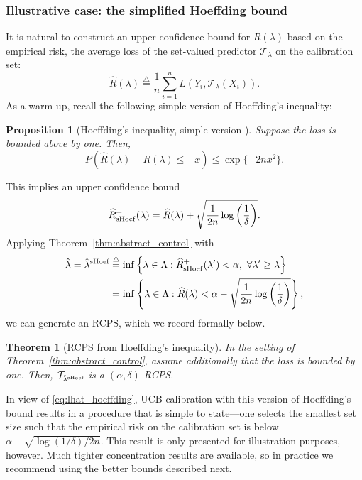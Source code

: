 \documentclass[10pt]{article}
\newtheorem{theorem}{Theorem}
\newtheorem{prop}{Proposition}
\newcommand{\T}{\mathcal{T}}
\newcommand{\lhat}{\hat{\lambda}}
\newcommand{\Rhat}{\widehat{R}}
\newcommand{\triangleq}{\stackrel{\triangle}{=}}
\begin{document}
\subsubsection{Illustrative case: the simplified Hoeffding bound}
\label{sec:hoeffding}
It is natural to construct an upper confidence bound for $R(\lambda)$ based on the empirical risk, the average loss of the set-valued predictor $\T_\lambda$ on the calibration set: 
\begin{equation*}
\widehat{R}(\lambda) \triangleq \frac{1}{n} \sum_{i=1}^n L\left(Y_i, \T_\lambda(X_i)\right).
\end{equation*}
As a warm-up, recall the following simple version of Hoeffding's inequality:
\begin{prop}[Hoeffding's inequality, simple version  \cite{hoeffding1963}]
Suppose the loss is bounded above by one. Then,
\begin{equation*}
P\left( \widehat{R}(\lambda) - R(\lambda) \le -x\right) \le \exp\{-2nx^2\}.
\label{eq:hoeffding_bound}
\end{equation*}
\end{prop}
This implies an upper confidence bound 
\begin{equation}\label{eq:Rhat_sim_hoeffding}
\widehat{R}^+_{{\rm sHoef}}(\lambda) = \widehat{R}(\lambda) + \sqrt{\frac{1}{2n}\log\left(\frac{1}{\delta}\right)}.
\end{equation}
Applying Theorem~\ref{thm:abstract_control} with 
\begin{align}
\lhat = \hat{\lambda}^{\textnormal{sHoef}} 
&\triangleq \inf \left\{\lambda \in \Lambda : \Rhat_{{\rm sHoef}}^+(\lambda') < \alpha, \,\, \forall \lambda' \ge \lambda \right\} \nonumber \\
&= \inf \left\{\lambda \in \Lambda : \widehat{R}(\lambda) < \alpha - \sqrt{\frac{1}{2n}\log\left(\frac{1}{\delta}\right)} \right\},
\label{eq:lhat_hoeffding}
\end{align}
we can generate an RCPS, which we record formally below.
\begin{theorem}[RCPS from Hoeffding's inequality]
\label{thm:hoeff}
In the setting of Theorem~\ref{thm:abstract_control}, assume additionally that the loss is bounded by one. Then, $\T_{\hat{\lambda}^{\textnormal{sHoef}}}$ is a $(\alpha, \delta)$-RCPS.
\end{theorem}
In view of \eqref{eq:lhat_hoeffding}, UCB calibration with this version of Hoeffding's bound results in a procedure that is simple to state---one selects the smallest set size such that the empirical risk on the calibration set is below $\alpha - \sqrt{\log(1/\delta) / 2n}$. This result is only presented for illustration purposes, however. Much tighter  concentration results are available, so in practice we recommend using the better bounds described next.
\end{document}
